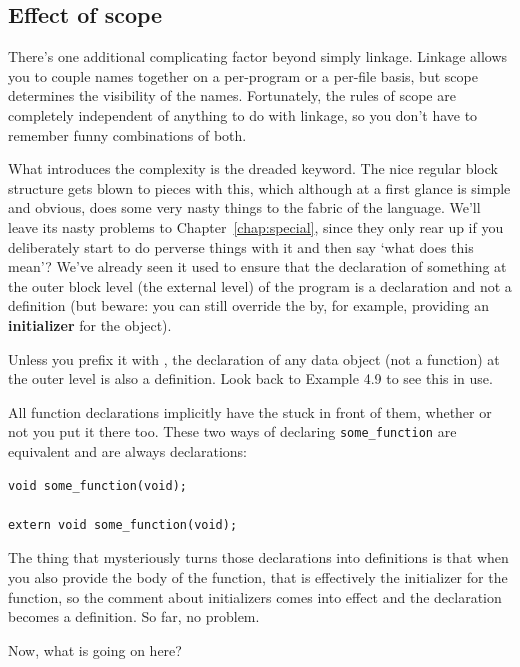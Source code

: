   \subsection{Effect of scope}
   

   There's one additional complicating factor beyond simply linkage.
    Linkage allows you to couple names together on a per-program or a
    per-file basis, but scope determines the visibility of the names.
    Fortunately, the rules of scope are completely independent of anything
    to do with linkage, so you don't have to remember funny combinations of
    both.


   What introduces the complexity is the dreaded \extern{} keyword. The nice
    regular block structure gets blown to pieces with this, which although
    at a first glance is simple and obvious, does some very nasty things to
    the fabric of the language. We'll leave its nasty problems to
    Chapter~\ref{chap:special}, since they only rear up if you deliberately
    start to do perverse things with it and then say `what does this
    mean'? We've already seen it used to ensure that the declaration of
    something at the outer block level (the external level) of the program
    is a declaration and not a definition (but beware: you can still
    override the \extern{} by, for example, providing an
    \textbf{initializer} for the object).


   Unless you prefix it with \extern, the declaration of any
    data object (not a function) at the outer level is also a definition.
    Look back to Example 4.9 to see this in use.


   All function declarations implicitly have the \extern{}
    stuck in front of them, whether or not you put it there too. These two
    ways of declaring \texttt{some\_function} are equivalent and are
    always declarations:

\begin{Verbatim}
void some_function(void);

extern void some_function(void);
\end{Verbatim}

   The thing that mysteriously turns those declarations into definitions
    is that when you also provide the body of the function, that is
    effectively the initializer for the function, so the comment about
    initializers comes into effect and the declaration becomes a definition.
    So far, no problem.


   Now, what is going on here?

